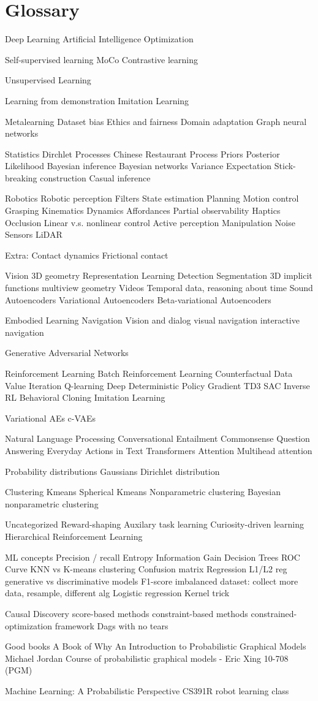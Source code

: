 \documentclass[../main.tex]{subfiles}
\begin{document}
\section{Glossary}
Deep Learning
Artificial Intelligence
Optimization

Self-supervised learning
MoCo
Contrastive learning

Unsupervised Learning

Learning from demonstration
Imitation Learning


Metalearning
Dataset bias
Ethics and fairness
Domain adaptation
Graph neural networks

Statistics
Dirchlet Processes
Chinese Restaurant Process
Priors
Posterior
Likelihood
Bayesian inference
Bayesian networks
Variance
Expectation
Stick-breaking construction
Casual inference

Robotics
Robotic perception
Filters
State estimation
Planning
Motion control
Grasping
Kinematics
Dynamics
Affordances
Partial observability
Haptics
Occlusion
Linear v.s. nonlinear control
Active perception
Manipulation
Noise
Sensors
LiDAR

Extra:
Contact dynamics
Frictional contact


Vision
3D geometry
Representation Learning
Detection
Segmentation
3D implicit functions
multiview geometry
Videos
Temporal data, reasoning about time
Sound
Autoencoders
Variational Autoencoders
Beta-variational Autoencoders

Embodied Learning
Navigation
Vision and dialog
visual navigation
interactive navigation

Generative Adversarial Networks

Reinforcement Learning
Batch Reinforcement Learning
Counterfactual Data
Value Iteration
Q-learning
Deep Deterministic Policy Gradient
TD3
SAC
Inverse RL
Behavioral Cloning
Imitation Learning

Variational AEs
c-VAEs



Natural Language Processing
Conversational Entailment
Commonsense Question Answering
Everyday Actions in Text
Transformers
Attention
Multihead attention

Probability distributions
Gaussians
Dirichlet distribution


Clustering
Kmeans
Spherical Kmeans
Nonparametric clustering
Bayesian nonparametric clustering

Uncategorized
Reward-shaping
Auxilary task learning
Curiosity-driven learning
Hierarchical Reinforcement Learning

ML concepts
Precision / recall
Entropy
Information Gain
Decision Trees
ROC Curve
KNN vs K-means clustering
Confusion matrix
Regression
L1/L2 reg
generative vs discriminative models
F1-score
imbalanced dataset: collect more data, resample, different alg
Logistic regression
Kernel trick


Causal Discovery
score-based methods
constraint-based methods
constrained-optimization framework
Dags with no tears


Good books
A Book of Why
An Introduction to Probabilistic Graphical Models Michael Jordan
Course of probabilistic graphical models - Eric Xing 10-708 (PGM)

Machine Learning: A Probabilistic Perspective
CS391R robot learning class
\end{document}
